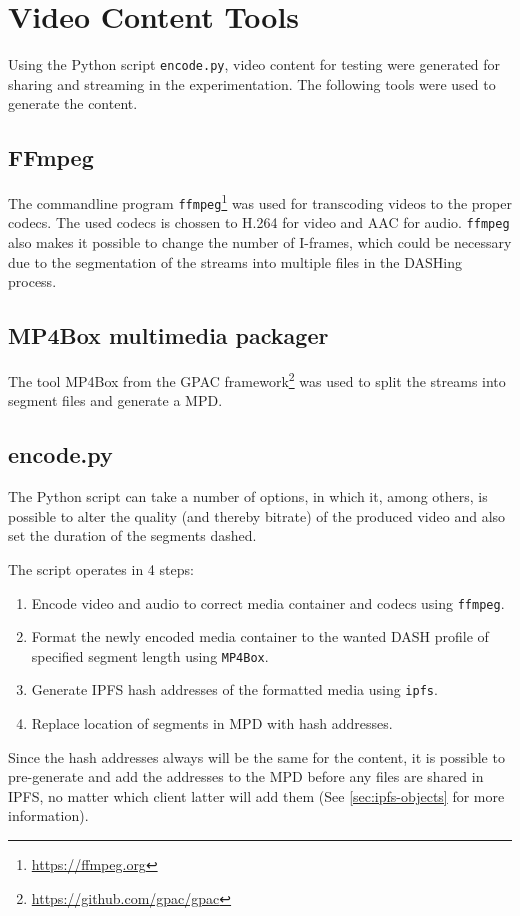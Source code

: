 \section{Video Content Tools}
\label{sec:impl-video}
Using the Python script \texttt{encode.py}, video content for testing were generated for sharing and streaming in the experimentation. The following tools were used to generate the content.

\subsection{FFmpeg}
The commandline program \texttt{ffmpeg}\footnote{\url{https://ffmpeg.org}} was used for transcoding videos to the proper codecs. The used codecs is chossen to H.264 for video and AAC for audio. 
\texttt{ffmpeg} also makes it possible to change the number of I-frames, which could be necessary due to the segmentation of the streams into multiple files in the DASHing process.

\subsection{MP4Box multimedia packager}
The tool MP4Box from the GPAC framework\footnote{\url{https://github.com/gpac/gpac}} was used to split the streams into segment files and generate a \ac{MPD}.

\subsection{encode.py}
The Python script can take a number of options, in which it, among others, is possible to alter the quality (and thereby bitrate) of the produced video and also set the duration of the segments dashed.

The script operates in 4 steps:
\begin{enumerate}
    \item Encode video and audio to correct media container and codecs using \texttt{ffmpeg}.
    \item Format the newly encoded media container to the wanted DASH profile of specified segment length using \texttt{MP4Box}.
    \item Generate \ac{IPFS} hash addresses of the formatted media using \texttt{ipfs}.
    \item Replace location of segments in \ac{MPD} with hash addresses.
\end{enumerate}

Since the hash addresses always will be the same for the content, it is possible to pre-generate and add the addresses to the \ac{MPD} before any files are shared in \ac{IPFS}, no matter which client latter will add them (See \autoref{sec:ipfs-objects} for more information).

